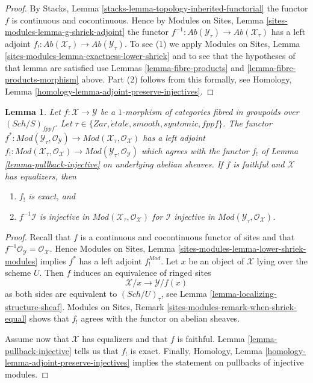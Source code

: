 \documentclass{stacks-project}
\theoremstyle{plain}
\newtheorem{lemma}[subsection]{Lemma}
\theoremstyle{definition}
\theoremstyle{remark}
\numberwithin{equation}{subsection}
\def\Sch{\mathit{Sch}}
\def\etale{{\acute{e}tale}}
\begin{document}
\begin{proof}
By
Stacks, Lemma \ref{stacks-lemma-topology-inherited-functorial}
the functor $f$ is continuous and cocontinuous. Hence by
Modules on Sites, Lemma \ref{sites-modules-lemma-g-shriek-adjoint}
the functor
$f^{-1} : \textit{Ab}(\mathcal{Y}_\tau) \to \textit{Ab}(\mathcal{X}_\tau)$
has a left adjoint
$f_! : \textit{Ab}(\mathcal{X}_\tau) \to \textit{Ab}(\mathcal{Y}_\tau)$.
To see (1) we apply
Modules on Sites, Lemma \ref{sites-modules-lemma-exactness-lower-shriek}
and to see that the hypotheses of that lemma are satisfied use
Lemmas \ref{lemma-fibre-products} and
\ref{lemma-fibre-products-morphism}
above. Part (2) follows from this formally, see
Homology, Lemma \ref{homology-lemma-adjoint-preserve-injectives}.
\end{proof}

\begin{lemma}
\label{lemma-pullback-injective-modules}
Let $f : \mathcal{X} \to \mathcal{Y}$ be a $1$-morphism of categories
fibred in groupoids over $(\Sch/S)_{fppf}$. Let
$\tau \in \{Zar, \etale, smooth, syntomic, fppf\}$.
The functor
$f^* : \textit{Mod}(\mathcal{Y}_\tau, \mathcal{O}_\mathcal{Y}) \to
\textit{Mod}(\mathcal{X}_\tau, \mathcal{O}_\mathcal{X})$
has a left adjoint
$f_! : \textit{Mod}(\mathcal{X}_\tau, \mathcal{O}_\mathcal{X}) \to
\textit{Mod}(\mathcal{Y}_\tau, \mathcal{O}_\mathcal{Y})$ which
agrees with the functor $f_!$ of Lemma \ref{lemma-pullback-injective}
on underlying abelian sheaves.
If $f$ is faithful and $\mathcal{X}$ has equalizers, then
\begin{enumerate}
\item $f_!$ is exact, and
\item $f^{-1}\mathcal{I}$ is injective in
$\textit{Mod}(\mathcal{X}_\tau, \mathcal{O}_\mathcal{X})$
for $\mathcal{I}$ injective in
$\textit{Mod}(\mathcal{Y}_\tau, \mathcal{O}_\mathcal{X})$.
\end{enumerate}
\end{lemma}

\begin{proof}
Recall that $f$ is a continuous and cocontinuous functor of sites
and that $f^{-1}\mathcal{O}_\mathcal{Y} = \mathcal{O}_\mathcal{X}$. Hence
Modules on Sites, Lemma \ref{sites-modules-lemma-lower-shriek-modules}
implies $f^*$ has a left adjoint $f_!^{Mod}$.
Let $x$ be an object of $\mathcal{X}$ lying over the scheme $U$.
Then $f$ induces an equivalence of ringed sites
$$
\mathcal{X}/x \longrightarrow \mathcal{Y}/f(x)
$$
as both sides are equivalent to $(\Sch/U)_\tau$, see
Lemma \ref{lemma-localizing-structure-sheaf}.
Modules on Sites, Remark \ref{sites-modules-remark-when-shriek-equal}
shows that $f_!$ agrees with the functor on abelian sheaves.

\medskip\noindent
Assume now that $\mathcal{X}$ has equalizers and that $f$ is faithful.
Lemma \ref{lemma-pullback-injective}
tells us that $f_!$ is exact. Finally,
Homology, Lemma \ref{homology-lemma-adjoint-preserve-injectives}
implies the statement on pullbacks of injective modules.
\end{proof}
\end{document}
